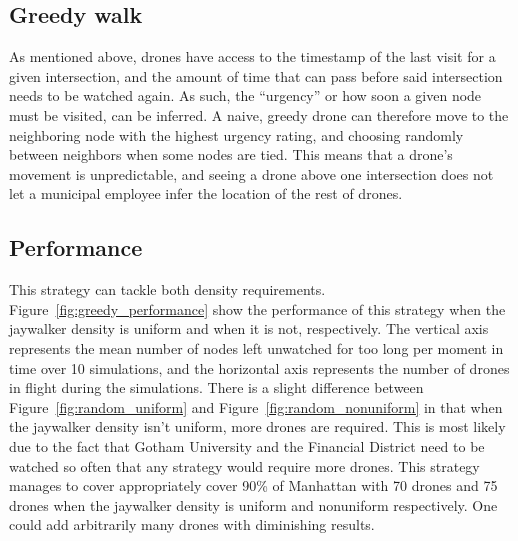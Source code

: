 \documentclass{article}
\begin{document}
\subsection{Greedy walk}
\label{sub:greedy_walk}
As mentioned above, drones have access to the timestamp of the last visit for a given intersection, and the amount of time that can pass before said intersection needs to be watched again. As such, the ``urgency'' or how soon a given node must be visited, can be inferred. A naive, greedy drone can therefore move to the neighboring node with the highest urgency rating, and choosing randomly between neighbors when some nodes are tied. This means that a drone’s movement is unpredictable, and seeing a drone above one intersection does not let a municipal employee infer the location of the rest of drones.

\subsection{Performance}
\label{sub:greey_performance}
This strategy can tackle both density requirements. Figure~\ref{fig:greedy_performance} show the performance of this strategy when the jaywalker density is uniform and when it is not, respectively. The vertical axis represents the mean number of nodes left unwatched for too long per moment in time over 10 simulations, and the horizontal axis represents the number of drones in flight during the simulations. There is a slight difference between Figure~\ref{fig:random_uniform} and Figure~\ref{fig:random_nonuniform} in that when the jaywalker density isn't uniform, more drones are required. This is most likely due to the fact that Gotham University and the Financial District need to be watched so often that any strategy would require more drones. This strategy manages to cover appropriately cover 90\% of Manhattan with 70 drones and 75 drones when the jaywalker density is uniform and nonuniform respectively. One could add arbitrarily many drones with diminishing results.
\end{document}
